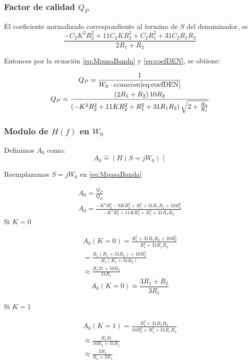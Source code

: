 \documentclass[../../tc_tp3_main.tex]{subfiles}
\begin{document}
\subsubsection{Factor de calidad $Q_P$}
El coeficiente normalizado correspondiente al termino de $S$ del denominador, es
\begin{equation}
\frac{-C_2 K ^2 R_2^2 + 11  C_2 K R_2 ^2 + C_2 R_1^2 +31 C_2 R_1 R_2}{2R_1 +R_2} \label{eq:coefDEN}
\end{equation}


Entonces por la ecuación \ref{eq:MpasaBanda} y \ref{eq:coefDEN}, se obtiene:

\begin{gather}
Q_P=\frac{1}{W_0 \cdot ecuacion\ref{eq:coefDEN}}\\
Q_P=\frac{\left( 2R_1 +R_2 \right) 10 R_2 }{\left( - K ^2 R_2^2 + 11   K R_2 ^2 +  R_1^2 +31  R_1 R_2 \right)\sqrt{2+\frac{R_2}{R_1}} }
\end{gather}


\subsubsection{Modulo de $H(f)$ en $W_0$}
Definimos $A_0$ como:
\begin{equation}
A_0	\widehat{=} \mid H(S=jW_0) \mid
\end{equation}

Reemplazamos $S=jW_0$ en \ref{eq:MpasaBanda}

\begin{gather}
A_0 =\frac{Q_P}{Q_Z}\\
A_0=\frac{- K ^2 R_2^2 - 9   K R_2 ^2 +  R_1^2 +31  R_1 R_2+10  R_2^2}{ - K ^2 R_2^2 + 11   K R_2 ^2 +  R_1^2 +31  R_1 R_2 }
\end{gather}
Si $K=0$

\begin{equation}
\begin{split}
A_0(K=0) =\frac{R_1^2 +31  R_1 R_2+10  R_2^2}{  R_1^2 +31  R_1 R_2}\\
= \frac{R_1(R_1+31R_2)+10R_2^2}{R_1(R_1+31R_2)}\\
\approx \frac{R_1 31 + 10 R_2}{31 R_1}
\end{split}
\end{equation}
\begin{equation}
A_0(K=0) \approx \frac {3R_1 + R_2}{3R_1} \label{eq:A00}
\end{equation}

Si $K=1$

\begin{equation}
\begin{split}
A_0(K=1) =\frac{R_1^2 + 31R_1 R_2}{10 R_2^2 +R_1^2+31R_1 R_2} \\
\approx \frac{R_1 31}{10 R_2 + 31 R_1} \\
 \approx \frac{3 R_1}{R_2 + 3 R_1}
\end{split}
\end{equation}
\end{document}
